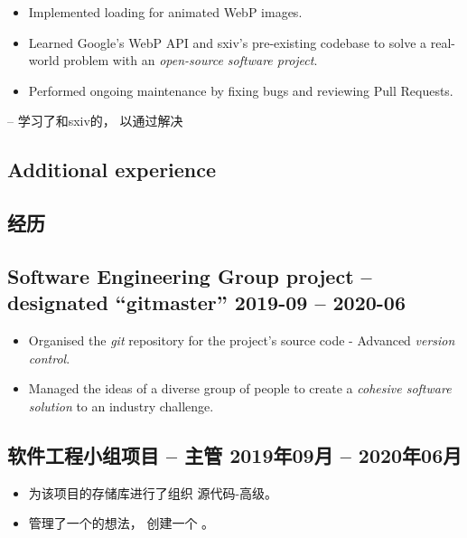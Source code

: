 \documentclass[cv.tex]{subfiles}
\begin{document}
\begin{itemize}
\begin{xcn}
\end{xcn}
\begin{xen}
\begin{itemize}
    \item Implemented loading for animated WebP images.
    \item Learned Google's WebP API and sxiv's pre-existing codebase to solve a
        real-world problem with an \emph{open-source software project}.
    \item Performed ongoing maintenance by fixing bugs and reviewing Pull
        Requests.
\end{itemize}
\end{xen}
\begin{xcn}
    -- 学习了和sxiv的，
    以通过解决
\end{xcn}
        \end{itemize}
\begin{xen}
\section{Additional experience}
\end{xen}
\begin{xcn}
\section{经历}
\end{xcn}
\begin{xen}
    \subsection{Software Engineering Group project -- designated ``gitmaster''
    \hfill 2019-09 -- 2020-06}
        \begin{itemize}
            \item Organised the \emph{git} repository for the project's source
                code - Advanced \emph{version control}.
            \item Managed the ideas of a diverse group of people to create a
                \emph{cohesive software solution} to an industry challenge.
        \end{itemize}
\end{xen}
\begin{xcn}
    \subsection{软件工程小组项目 -- 主管
    \hfill 2019年09月 -- 2020年06月}
        \begin{itemize}
            \item 为该项目的存储库进行了组织
                源代码-高级。
            \item 管理了一个的想法，
                创建一个 。
        \end{itemize}
\end{xcn}
\end{document}
